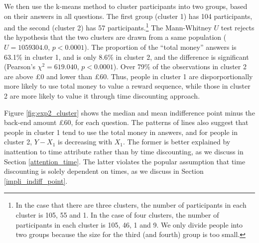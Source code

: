 \documentclass[
  12pt,
]{article}
\begin{document}
We then use the k-means method to cluster participants into two groups,
based on their answers in all questions. The first group (cluster 1) has
104 participants, and the second (cluster 2) has 57
participants.\footnote{In the case that there are three clusters, the
  number of participants in each cluster is 105, 55 and 1. In the case
  of four clusters, the number of participants in each cluster is 105,
  46, 1 and 9. We only divide people into two groups because the size
  for the third (and fourth) group is too small.} The Mann-Whitney \(U\)
test rejects the hypothesis that the two clusters are drawn from a same
population (\(U=1059304.0\), \(p<0.0001\)). The proportion of the
``total money'' answers is 63.1\% in cluster 1, and is only 8.6\% in
cluster 2, and the difference is significant (Pearson's
\(\chi^2 = 619.040\), \(p<0.0001\)). Over 79\% of the observations in
cluster 2 are above £0 and lower than £60. Thus, people in cluster 1 are
disporportionally more likely to use total money to value a reward
sequence, while those in cluster 2 are more likely to value it through
time discounting approach.

Figure \ref{fig:exp2_cluster} shows the median and mean indifference
point minus the back-end amount £60, for each question. The patterns of
lines also suggest that people in cluster 1 tend to use the total money
in answers, and for people in cluster 2, \(Y - X_1\) is decreasing with
\(X_1\). The former is better explained by inattention to time attribute
rather than by time discounting, as we discuss in Section
\ref{attention_time}. The latter violates the popular assumption that
time discounting is solely dependent on times, as we discuss in Section
\ref{impli_indiff_point}.
\end{document}
